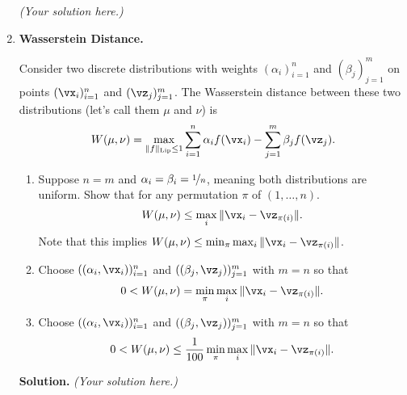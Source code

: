\documentclass{article}
\def\Lip{\textup{Lip}}
\theoremstyle{definition}
\theoremstyle{remark}
\newenvironment{Q}
                {%
                    \clearpage
                \item
                    }
                {%
                    \phantom{s}
                  \bigskip
                  \textbf{Solution.}
                }
\begin{document}
\begin{enumerate}
                  \emph{(Your solution here.)}


                        \begin{Q}
                            \textbf{Wasserstein Distance.}

                            Consider two discrete distributions with weights $(\alpha_i)_{i=1}^n$
                            and $(\beta_j)_{j=1}^m$ on points $(\vx_i)_{i=1}^n$ and $(\vz_j)_{j=1}^m$.
                            The Wasserstein distance between these two distributions (let's call them
                            $\mu$ and $\nu$) is
                            \[
                              W(\mu, \nu) = \max_{\|f\|_{\Lip} \leq 1} \sum_{i=1}^n \alpha_i f(\vx_i) - \sum_{j=1}^m \beta_j f(\vz_j).
                            \]

                            \begin{enumerate}
                              \item
                                Suppose $n=m$ and $\alpha_i = \beta_i = \nicefrac 1 n$,
                                meaning both distributions are uniform.
                                Show that for any permutation $\pi$ of $(1,\ldots, n)$.
                                \[
                                  W(\mu,\nu) \leq \max_i\| \vx_i - \vz_{\pi(i)}\|.
                                \]
                                Note that this implies
                                $W(\mu,\nu) \leq \min_\pi \max_i \|\vx_i - \vz_{\pi(i)}\|$.


                              \item
                                Choose $((\alpha_i,\vx_i))_{i=1}^n$ and $((\beta_j,\vz_j))_{j=1}^m$
                                with $m=n$ so that
                                \[
                                  0 < W(\mu,\nu) = \min_\pi \max_i \|\vx_i - \vz_{\pi(i)}\|.
                                \]

                              \item
                                Choose $((\alpha_i,\vx_i))_{i=1}^n$ and $((\beta_j,\vz_j))_{j=1}^m$
                                with $m=n$ so that
                                \[
                                  0 < W(\mu,\nu) \leq \frac 1 {100}
                                  \min_\pi \max_i \|\vx_i - \vz_{\pi(i)}\|.
                                \]
                        \end{enumerate}
                    \end{Q}
                        \emph{(Your solution here.)}



\end{enumerate}
\end{document}
